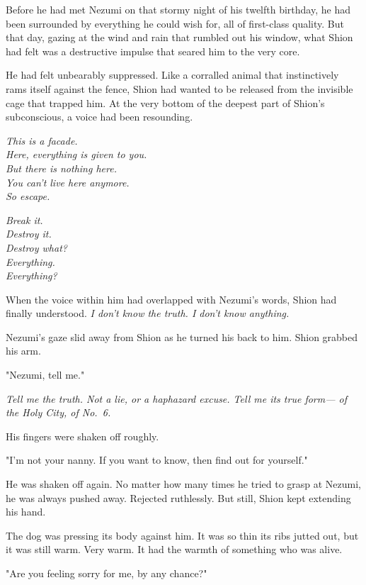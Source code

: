 Before he had met Nezumi on that stormy night of his twelfth birthday,
he had been surrounded by everything he could wish for, all of
first-class quality. But that day, gazing at the wind and rain that
rumbled out his window, what Shion had felt was a destructive impulse
that seared him to the very core.

He had felt unbearably suppressed. Like a corralled animal that
instinctively rams itself against the fence, Shion had wanted to be
released from the invisible cage that trapped him. At the very bottom of
the deepest part of Shion's subconscious, a voice had been resounding.

\myspace

\emph{This is a facade.\\
	Here, everything is given to you.\\
	But there is nothing here.\\
	You can't live here anymore.\\
	So escape.}

\myspace

\emph{Break it.\\
	Destroy it.\\
	Destroy what?\\
	Everything.\\
	Everything?}

\myspace

When the voice within him had overlapped with Nezumi's words, Shion had
finally understood. \emph{I don't know the truth. I don't know anything.}

Nezumi's gaze slid away from Shion as he turned his back to him. Shion
grabbed his arm.

"Nezumi, tell me."

\emph{Tell me the truth. Not a lie, or a haphazard excuse. Tell me its true
form--- of the Holy City, of No.~6.}

His fingers were shaken off roughly.

"I'm not your nanny. If you want to know, then find out for yourself."

He was shaken off again. No matter how many times he tried to grasp at
Nezumi, he was always pushed away. Rejected ruthlessly. But still, Shion
kept extending his hand.

The dog was pressing its body against him. It was so thin its ribs
jutted out, but it was still warm. Very warm. It had the warmth of
something who was alive.

"Are you feeling sorry for me, by any chance?"

